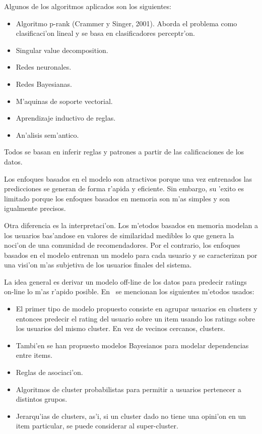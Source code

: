 \documentclass[11pt]{article}
\begin{document}
Algunos de los algoritmos aplicados son los siguientes:
\begin{itemize}
\item Algoritmo p-rank (Crammer y Singer, 2001). Aborda el problema como clasificaci'on lineal y se basa en clasificadores perceptr'on.
\item Singular value decomposition.
\item Redes neuronales.
\item Redes Bayesianas.
\item M'aquinas de soporte vectorial.
\item Aprendizaje inductivo de reglas.
\item An'alisis sem'antico. 
\end{itemize}

Todos se basan en inferir reglas y patrones a partir de las calificaciones de los datos.

Los enfoques basados en el modelo son atractivos porque una vez entrenados las predicciones se generan de forma r'apida y eficiente. Sin embargo, su 'exito es limitado porque los enfoques basados en memoria son m'as simples y son igualmente precisos.

Otra diferencia es la interpretaci'on. Los m'etodos basados en memoria modelan a los usuarios bas'andose en valores de similaridad medibles lo que genera la noci'on de una comunidad de recomendadores. Por el contrario, los enfoques basados en el modelo entrenan un modelo para cada usuario y se caracterizan por una visi'on m'as subjetiva de los usuarios finales del sistema.

La idea general es derivar un modelo off-line de los datos para predecir ratings on-line lo m'as r'apido posible. En~\cite{start:candillier09} se mencionan los siguientes m'etodos usados:

\begin{itemize}
\item El primer tipo de modelo propuesto consiste en agrupar usuarios en clusters y entonces predecir el rating del usuario sobre un item usando los ratings sobre los usuarios del mismo cluster. En vez de vecinos cercanos, clusters.
\item Tambi'en se han propuesto modelos Bayesianos para modelar dependencias entre items. 
\item Reglas de asociaci'on.
\item Algoritmos de cluster probabilistas para permitir a usuarios pertenecer a distintos grupos.
\item Jerarqu'ias de clusters, as'i, si un cluster dado no tiene una opini'on en un item particular, se puede considerar al super-cluster.
\end{itemize}
\end{document}
